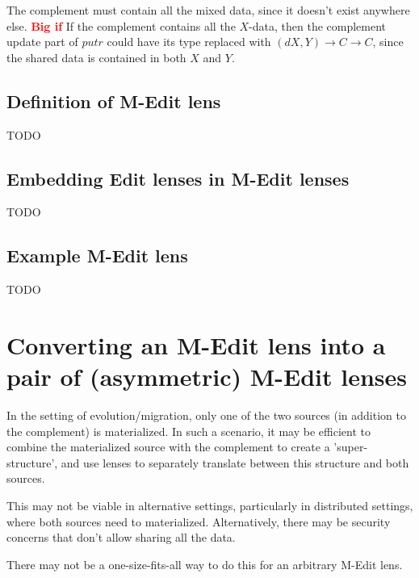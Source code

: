 \documentclass[a4paper,10pt]{article}
\newcommand{\finish}[1]{#1}
\newcommand{\comment}[1]{\finish{\textbf{\textcolor{red}{#1}}}}
\begin{document}
The complement must contain all the mixed data, since it doesn't exist anywhere else. \comment{Big if} If the complement contains all the $X$-data, then the complement update part of $putr$ could have its type replaced with $(dX, Y) \to C \to C$, since the shared data is contained in both $X$ and $Y$. 

\subsection{Definition of M-Edit lens}
TODO

\subsection{Embedding Edit lenses in M-Edit lenses}
TODO

\subsection{Example M-Edit lens}
TODO

\section{Converting an M-Edit lens into a pair of (asymmetric) M-Edit lenses}
In the setting of evolution/migration, only one of the two sources (in addition to the complement) is materialized. In such a scenario, it may be efficient to combine the materialized source with the complement to create a 'super-structure', and use lenses to separately translate between this structure and both sources. 

This may not be viable in alternative settings, particularly in distributed settings, where both sources need to materialized. Alternatively, there may be security concerns that don't allow sharing all the data.

There may not be a one-size-fits-all way to do this for an arbitrary M-Edit lens.
\end{document}
